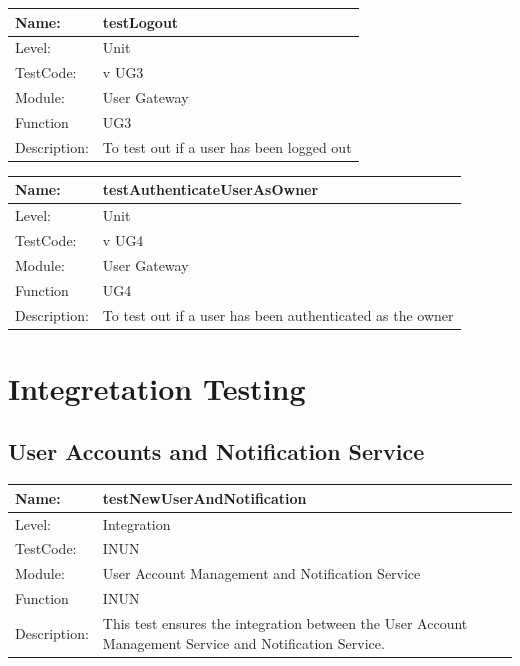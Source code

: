 \documentclass[12pt]{article}
\begin{document}
\begin{center}
\begin{tabular}{|l|p{12cm}|}
\hline

 Name: & testLogout\\
\hline
Level: & Unit \\
\hline
TestCode: & v UG3 \\
\hline
Module:& User Gateway\\
\hline
Function & UG3 \\
\hline
Description: & To test out if a user has been logged out \\
\hline

\end{tabular}
\end{center}


\begin{center}
\begin{tabular}{|l|p{12cm}|}
\hline

 Name: & testAuthenticateUserAsOwner \\
\hline
Level: & Unit \\
\hline
TestCode: & v UG4 \\
\hline
Module:& User Gateway\\
\hline
Function & UG4 \\
\hline
Description: & To test out if a user has been authenticated as the owner \\
\hline

\end{tabular}
\end{center}

\newpage
\section{Integretation Testing}

\subsection{User Accounts and Notification Service}
\begin{center}
\begin{tabular}{|l|p{12cm}|}
\hline
 Name: & testNewUserAndNotification  \\
\hline
Level: & Integration \\
\hline
TestCode: & INUN \\
\hline
Module:& User Account Management and Notification Service \\
\hline
Function & INUN \\
\hline
Description: & This test ensures the integration between the User Account Management Service and Notification Service. \\
\hline
\end{tabular}
\end{center}
\end{document}
